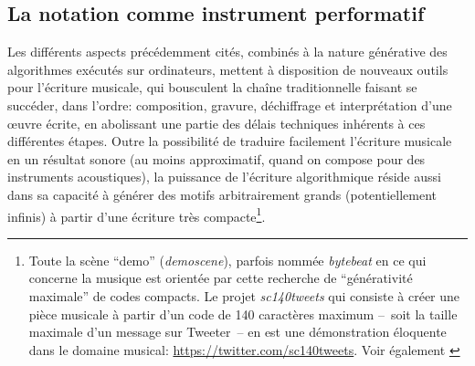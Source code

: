 \subsection{La notation comme instrument performatif}
\noindent Les différents aspects précédemment cités, combinés à la nature générative des algorithmes exécutés sur ordinateurs, mettent à disposition de nouveaux outils pour l'écriture musicale, qui bousculent la chaîne traditionnelle faisant se succéder, dans l'ordre: composition, gravure, déchiffrage et interprétation d'une œuvre écrite, en abolissant une partie des délais techniques inhérents à ces différentes étapes. Outre la possibilité de traduire facilement l'écriture musicale en un résultat sonore (au moins approximatif, quand on compose pour des instruments acoustiques), la puissance de l'écriture algorithmique réside aussi dans sa capacité à générer des motifs arbitrairement grands (potentiellement infinis) à partir d'une écriture très compacte\footnote{Toute la scène ``demo'' (\textit{demoscene}), parfois nommée \textit{bytebeat} en ce qui concerne la musique est orientée par cette recherche de ``générativité maximale'' de codes compacts. Le projet \textit{sc140tweets} qui consiste à créer une pièce musicale à partir d'un code de 140 caractères maximum --~soit la taille maximale d'un message sur Tweeter~-- en est une démonstration éloquente dans le domaine musical: \url{https://twitter.com/sc140tweets}. Voir également \cite{heikkila_discovering_2011}}.\\


